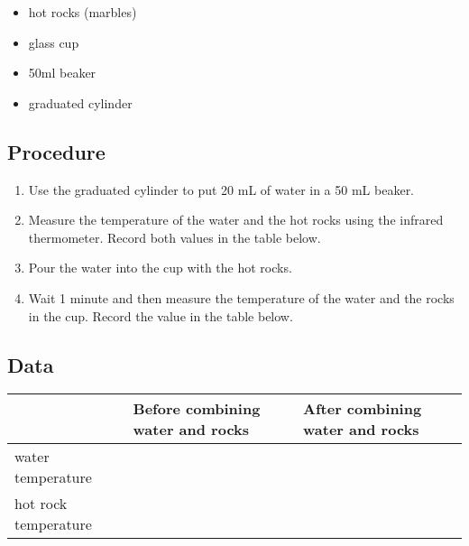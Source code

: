 \documentclass[12pt]{exam}
\begin{document}
\begin{itemize}
    \item hot rocks (marbles)
    \item glass cup
    \item 50ml beaker
    \item graduated cylinder
\end{itemize}

\subsection*{Procedure}

\begin{enumerate}
    \item Use the graduated cylinder to put 20 mL of water in a 50 mL beaker.
    \item Measure the temperature of the water and the hot rocks using the infrared thermometer. Record both values in the table below.
    \item Pour the water into the cup with the hot rocks.
    \item Wait 1 minute and then measure the temperature of the water and the rocks in the cup. Record the value in the table below.
\end{enumerate}

\subsection*{Data}

\begin{tabular}{|p{4cm}|p{4cm}|p{4cm}|}
    \hline
    \quad & Before combining water and rocks & After combining water and rocks \\
    \hline
    water temperature & \quad & \quad \\
    \hline
    hot rock temperature & \quad & \quad \\
    \hline
\end{tabular}


    
\end{document}
